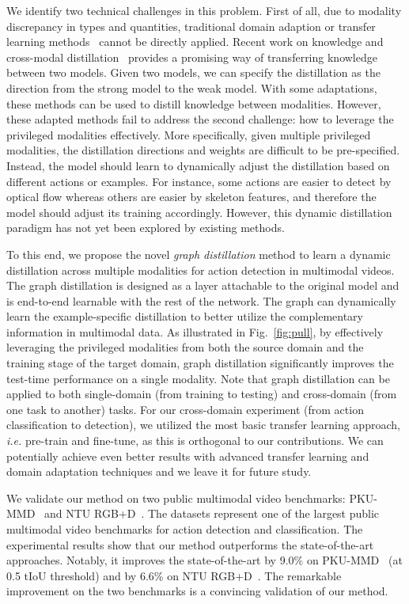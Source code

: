 We identify two technical challenges in this problem. First of all, due to modality discrepancy in types and quantities, traditional domain adaption or transfer learning methods~\cite{subspace_alignment,transfer} cannot be directly applied. Recent work on knowledge and cross-modal distillation~\cite{distillation_hinton,li2017learning,unifying,privileged_on_depth_shi} provides a promising way of transferring knowledge between two models. Given two models, we can specify the distillation as the direction from the strong model to the weak model. With some adaptations, these methods can be used to distill knowledge between modalities. However, these adapted methods fail to address the second challenge: how to leverage the privileged modalities effectively. More specifically, given multiple privileged modalities, the distillation directions and weights are difficult to be pre-specified. Instead, the model should learn to dynamically adjust the distillation based on different actions or examples. 
For instance, some actions are easier to detect by optical flow whereas others are easier by skeleton features, and therefore the model should adjust its training accordingly. However, this dynamic distillation paradigm has not yet been explored by existing methods.

To this end, we propose the novel \emph{graph distillation} method to learn a dynamic distillation across multiple modalities for action detection in multimodal videos. The graph distillation is designed as a layer attachable to the original model and is end-to-end learnable with the rest of the network. The graph can dynamically learn the example-specific distillation to better utilize the complementary information in multimodal data. As illustrated in Fig.~\ref{fig:pull}, by effectively leveraging the privileged modalities from both the source domain and the training stage of the target domain, graph distillation significantly improves the test-time performance on a single modality. Note that graph distillation can be applied to both single-domain (from training to testing) and cross-domain (from one task to another) tasks. For our cross-domain experiment (from action classification to detection), we utilized the most basic transfer learning approach, \textit{i.e.} pre-train and fine-tune, as this is orthogonal to our contributions. We can potentially achieve even better results with advanced transfer learning and domain adaptation techniques and we leave it for future study. 

We validate our method on two public multimodal video benchmarks: PKU-MMD~\cite{pku_mmd} and NTU RGB+D~\cite{ntu_rgbd}. The datasets represent one of the largest public multimodal video benchmarks for action detection and classification. The experimental results show that our method outperforms the state-of-the-art approaches. Notably, it improves the state-of-the-art by 9.0\% on PKU-MMD~\cite{pku_mmd} (at 0.5 tIoU threshold) and by 6.6\% on NTU RGB+D~\cite{ntu_rgbd}. The remarkable improvement on the two benchmarks is a convincing validation of our method. 

